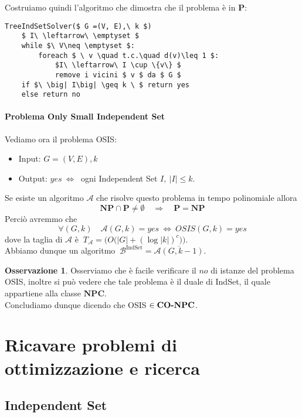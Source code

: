 \documentclass[a4paper]{article}
\theoremstyle{definition}
\newtheorem{obs}{Osservazione}[subsection]
\newcommand{\p}{\mathbf{P}}
\newcommand{\np}{\mathbf{NP}}
\newcommand{\npc}{\mathbf{NPC}}
\newcommand{\alg}[1]{\mathcal{#1}}
\begin{document}
		Costruiamo quindi l'algoritmo che dimostra che il problema è in $ \p $:
		\begin{lstlisting}[frame=tb, mathescape= true, caption={Algoritmo che risolve TreeIndependentSet}]
TreeIndSetSolver($ G =(V, E),\ k $)
	$ I\ \leftarrow\ \emptyset $
	while $\ V\neq \emptyset $:
		foreach $ \ v \quad t.c.\quad d(v)\leq 1 $:
			$I\ \leftarrow\ I \cup \{v\} $
			remove i vicini $ v $ da $ G $
	if $\ \big| I\big| \geq k \ $ return yes
	else return no
		\end{lstlisting}
		
		\paragraph{Problema Only Small Independent Set} Vediamo ora il problema OSIS:
		\begin{itemize}
			\item Input: $ G = (V, E), k $
			\item Output: $ yes\ \Leftrightarrow\ $ ogni Independent Set $ I,\ \big| I \big| \leq k $.
		\end{itemize}
		
		Se esiste un algoritmo $ \alg{A} $ che risolve questo problema in tempo polinomiale allora 
		\[ 
			\np \cap \p \neq \emptyset\quad \Rightarrow\quad \p = \np 
		\]
		Perciò avremmo che
		\[
			\forall (G, k)\quad \alg{A}(G, k) = yes\ \Leftrightarrow\ OSIS(G, k) = yes
		\]
		dove la taglia di $ \alg{A} $ è 
		$ \ T_{\alg{A}} = \Big( O\big(\big| G \big| + (\log \big|k \big|)^c\big) \Big) $.\\
		
		Abbiamo dunque un algoritmo $\ \alg{B}^{\text{IndSet}} = \overline{\alg{A}(G, k-1)} $.
		
		\begin{obs}
			Osserviamo che è facile verificare il $ no $ di istanze del problema OSIS, inoltre si può vedere che tale problema è il duale di IndSet, il quale appartiene alla classe $ \npc $.\\
			Concludiamo dunque dicendo che OSIS $ \in \text{\textbf{CO-}}\npc $.
		\end{obs}
		
		\newpage
		
	\section{Ricavare problemi di ottimizzazione e ricerca}
		
		\subsection{Independent Set}
		
\end{document}
